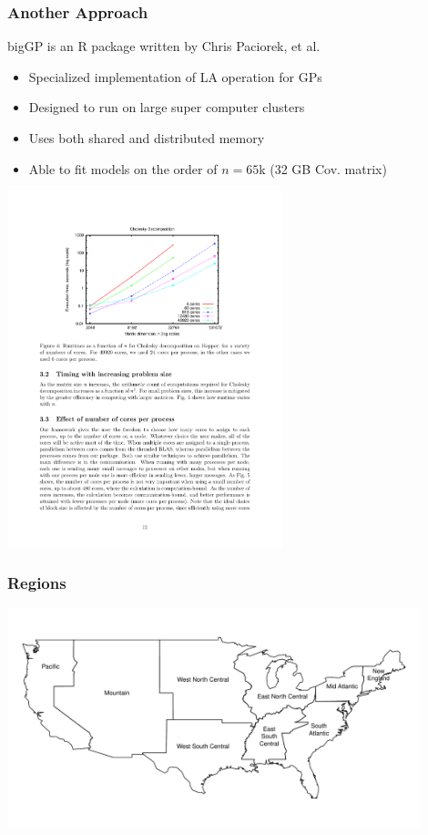 \documentclass[t]{beamer}\usepackage[]{graphicx}\usepackage[]{color}
\begin{document}
\begin{frame}
\frametitle{Another Approach}

bigGP is an R package written by Chris Paciorek, et al.

\begin{itemize}
\item Specialized implementation of LA operation for GPs
\item Designed to run on large super computer clusters
\item Uses both shared and distributed memory
\item Able to fit models on the order of $n = 65$k (32 GB Cov. matrix)
\end{itemize}


\begin{center}
\includegraphics[width=0.6\textwidth]{figs/Paciorek.pdf}
\end{center}

\end{frame}




\begin{frame}[label=regions]
\frametitle{Regions}

\vfill
\begin{center}
\includegraphics[width=0.9\textwidth]{figs/pm_regions.pdf}
\end{center}
\vfill

\hyperlink{pm_results}{}

\end{frame}
\end{document}
